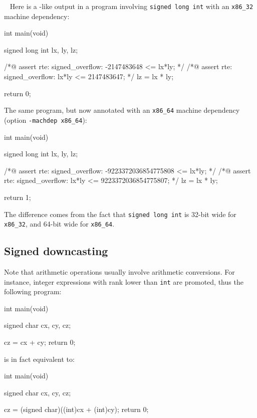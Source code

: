 \begin{example} ~
Here is a \rte{}-like output in a program involving \lstinline|signed long int|
with an \lstinline|x86_32| machine dependency:
\begin{listing-nonumber}
int main(void) {
  signed long int lx, ly, lz;

  /*@ assert rte: signed_overflow: -2147483648 <= lx*ly; */
  /*@ assert rte: signed_overflow: lx*ly <= 2147483647; */
  lz = lx * ly;

  return 0;
}
\end{listing-nonumber}

The same program, but now annotated with an \lstinline|x86_64| machine
dependency (option \texttt{-machdep x86\_64}):
\begin{listing-nonumber}
int main(void) {
  signed long int lx, ly, lz;

  /*@ assert rte: signed_overflow: -9223372036854775808 <= lx*ly; */
  /*@ assert rte: signed_overflow: lx*ly <= 9223372036854775807; */
  lz = lx * ly;

  return 1;
}
\end{listing-nonumber}

The difference comes from the fact that \lstinline|signed long int| is 32-bit
wide for \lstinline|x86_32|, and 64-bit wide for \lstinline|x86_64|.

\end{example}

\subsection{Signed downcasting}

Note that arithmetic operations usually involve arithmetic conversions.  For
instance, integer expressions with rank lower than \lstinline|int| are promoted,
thus the following program:

\smallskip

\begin{listing-nonumber}
int main(void) {
  signed char cx, cy, cz;

  cz = cx + cy;
  return 0;
}
\end{listing-nonumber}

\smallskip
is in fact equivalent to:

\smallskip
\begin{listing-nonumber}
int main(void) {
  signed char cx, cy, cz;

  cz = (signed char)((int)cx + (int)cy);
  return 0;
}
\end{listing-nonumber}

